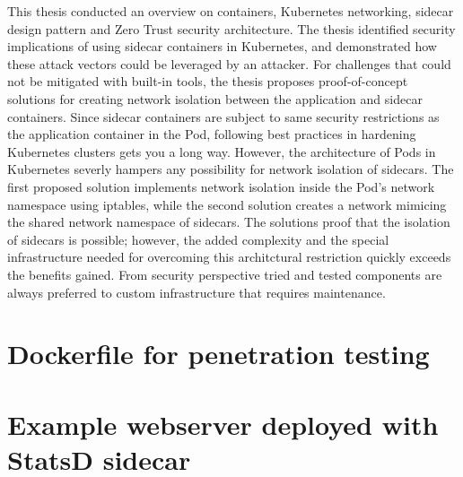 \documentclass[english, 12pt, a4paper, sci, utf8, a-2b, online]{aaltothesis}
\begin{document}
This thesis conducted an overview on containers, Kubernetes networking, sidecar design pattern and Zero Trust security architecture.
The thesis identified security implications of using sidecar containers in Kubernetes, and demonstrated how these attack vectors could be leveraged by an attacker.
For challenges that could not be mitigated with built-in tools, the thesis proposes proof-of-concept solutions for creating network isolation between the application and sidecar containers.
Since sidecar containers are subject to same security restrictions as the application container in the Pod, following best practices in hardening Kubernetes clusters gets you a long way.
However, the architecture of Pods in Kubernetes severly hampers any possibility for network isolation of sidecars.
The first proposed solution implements network isolation inside the Pod's network namespace using iptables, while the second solution creates a network mimicing the shared network namespace of sidecars.
The solutions proof that the isolation of sidecars is possible; however, the added complexity and the special infrastructure needed for overcoming this architctural restriction quickly exceeds the benefits gained.
From security perspective tried and tested components are always preferred to custom infrastructure that requires maintenance.

\clearpage

\thesisbibliography
\printbibliography

\clearpage

\thesisappendix

\section{Dockerfile for penetration testing} \label{app:malicious-sidecar}



\clearpage

\section{Example webserver deployed with StatsD sidecar} \label{app:node-webapp}
\end{document}
